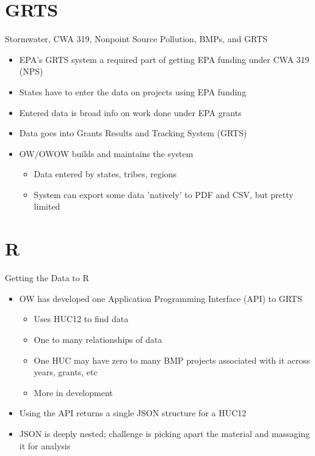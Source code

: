 \documentclass{beamer}
\begin{document}
\section{GRTS}

\begin{frame}{Stormwater, CWA 319, Nonpoint Source Pollution, BMPs, and GRTS}
  \begin{itemize}
  \item EPA's GRTS system a required part of getting EPA funding under CWA 319 (NPS)
  \item States have to enter the data on projects using EPA funding 
  \item Entered data is broad info on work done under EPA grants
  \item Data goes into Grants Results and Tracking System (GRTS)
  \item OW/OWOW builds and maintains the system
    \begin{itemize}
    \item Data entered by states, tribes, regions
    \item System can export some data 'natively' to PDF and CSV, but pretty limited
    \end{itemize}
  \end{itemize}
\end{frame}

\section{R}

\begin{frame}{Getting the Data to R}
  \begin{itemize}
  \item OW has developed one Application Programming Interface (API) to GRTS
    \begin{itemize}
	\item Uses HUC12 to find data
	\item One to many relationships of data
	\item One HUC may have zero to many BMP projects associated
           with it across years, grants, etc
        \item More in development
    \end{itemize}
    \item Using the API returns a single JSON structure for a HUC12
    \item JSON is deeply nested; challenge is picking apart the
      material and massaging it for analysis
  \end{itemize}
\end{frame}
\end{document}
